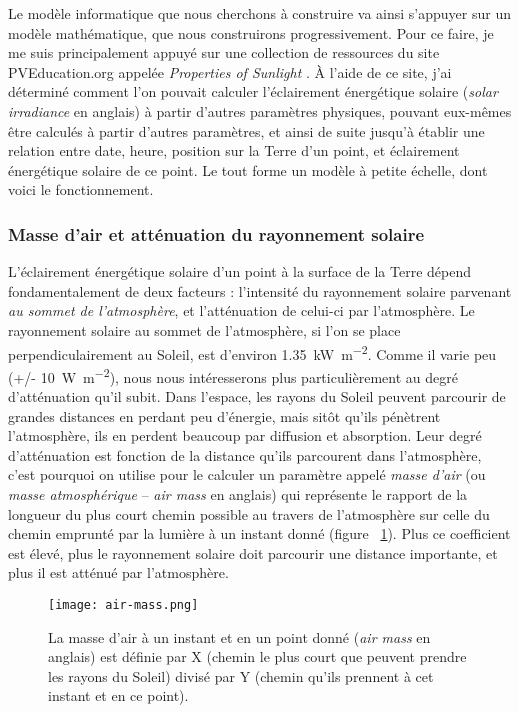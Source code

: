 \documentclass[12pt]{article}
\begin{document}
Le modèle informatique que nous cherchons à construire va ainsi s'appuyer sur un modèle mathématique, que nous construirons progressivement.
Pour ce faire, je me suis principalement appuyé sur une collection de ressources du site PVEducation.org appelée \emph{Properties of Sunlight} \cite{properties_of_sunlight}.
À l'aide de ce site, j'ai déterminé comment l'on pouvait calculer l'éclairement énergétique solaire (\textit{solar irradiance} en anglais) à partir d'autres paramètres physiques, pouvant eux-mêmes être calculés à partir d'autres paramètres, et ainsi de suite jusqu'à établir une relation entre date, heure, position sur la Terre d'un point, et éclairement énergétique solaire de ce point.
Le tout forme un modèle à petite échelle, dont voici le fonctionnement.

\subsubsection{Masse d'air et atténuation du rayonnement solaire}
L'éclairement énergétique solaire d'un point à la surface de la Terre dépend fondamentalement de deux facteurs : l'intensité du rayonnement solaire parvenant \emph{au sommet de l'atmosphère}, et l'atténuation de celui-ci par l'atmosphère. 
Le rayonnement solaire au sommet de l'atmosphère, si l'on se place perpendiculairement au Soleil, est d'environ \SI{1.35}{\kilo\watt\per\square\meter}.
Comme il varie peu (+/- \SI{10}{\watt\per\square\meter}), nous nous intéresserons plus particulièrement au degré d'atténuation qu'il subit.
Dans l'espace, les rayons du Soleil peuvent parcourir de grandes distances en perdant peu d'énergie, mais sitôt qu'ils pénètrent l'atmosphère, ils en perdent beaucoup par diffusion et absorption.
Leur degré d'atténuation est fonction de la distance qu'ils parcourent dans l'atmosphère, c'est pourquoi on utilise pour le calculer un paramètre appelé \emph{masse d'air} (ou \emph{masse atmosphérique} -- \textit{air mass} en anglais) \cite{air_mass_wiki} qui représente le rapport de la longueur du plus court chemin possible au travers de l'atmosphère sur celle du chemin emprunté par la lumière à un instant donné (figure ~\ref{fig:air-mass}). Plus ce coefficient est élevé, plus le rayonnement solaire doit parcourir une distance importante, et plus il est atténué par l'atmosphère.

\begin{figure}[!ht]
	\centerline{\texttt{[image: air-mass.png]}}
	\caption{La masse d'air à un instant et en un point donné (\textit{air mass} en anglais) est définie par X (chemin le plus court que peuvent prendre les rayons du Soleil) divisé par Y (chemin qu'ils prennent à cet instant et en ce point).}
	\label{fig:air-mass}
\end{figure}
\end{document}
